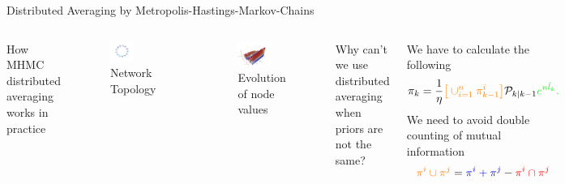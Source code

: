 \documentclass{beamer}
\theoremstyle{remark}
\begin{document}
\begin{frame}{Distributed Averaging by Metropolis-Hastings-Markov-Chains}
	\begin{columns}
		How MHMC distributed averaging works in practice
	  \vspace{-11pt}
		\begin{figure}
			\centering
			\includegraphics[width=0.50\textwidth, trim={2cm 3cm 2cm 2cm},clip]{graph_for_distributed_averaging}
			\vspace{-11pt}
			\caption*{\tiny Network  Topology}
		\end{figure}
		\vspace{-31pt}
		\begin{figure}
			\centering
			\includegraphics[width=0.70\textwidth, trim={0 0 5cm 2cm},clip]{values_for_dist_av}
			\vspace{-9pt}
			\caption*{\tiny Evolution of node values}
		\end{figure}
		{\color{red}Why can't we use distributed averaging when priors are not the same?}
		 
		We have to calculate the following
		\begin{equation*}
		{\pi}_{k}  = \frac{1}{\eta} {\color{orange}\big[\cup_{i=1}^{n}{\pi}^i_{k-1} \big]}
		\mathcal{P}_{k \vert k-1}  
		\color{green}e^{n\tilde{l}_k}.
		\end{equation*}
		We need to avoid double counting of mutual information
		\begin{equation*}
		{\color{orange}{\pi}^i\cup {\pi}^j} = { \color{blue}{\pi}^i + {\pi}^j} - {\color{red}{\pi}^i\cap {\pi}^j}
		\end{equation*}
	\end{columns}
\end{frame}
\end{document}
